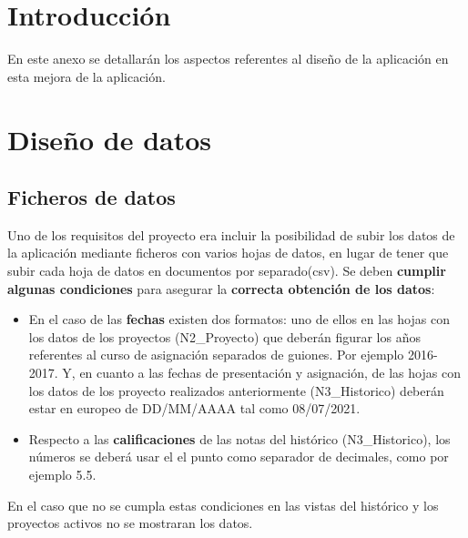 
\section{Introducción}
En este anexo se detallarán los aspectos referentes al diseño de la aplicación en esta mejora de la aplicación.

\section{Diseño de datos}

\subsection{Ficheros de datos}

Uno de los requisitos del proyecto era incluir la posibilidad de subir los datos de la aplicación mediante ficheros con varios hojas de datos, en lugar de tener que subir cada hoja de datos en documentos por separado(csv). Se deben \textbf{cumplir algunas condiciones} para asegurar la \textbf{correcta obtención de los datos}:
\begin{itemize}
	\tightlist
	\item En el caso de las \textbf{fechas} existen dos formatos: uno de ellos en las hojas con los datos de los proyectos (N2\_Proyecto) que deberán figurar los años referentes al curso de asignación separados de guiones. Por ejemplo 2016-2017. 
	Y, en cuanto a las fechas de presentación y asignación, de las hojas con los datos de los proyecto realizados anteriormente (N3\_Historico) deberán estar en europeo de DD/MM/AAAA tal como 08/07/2021.
	
	\item Respecto a las \textbf{calificaciones} de las notas del histórico (N3\_Historico), los números se deberá usar el el punto como separador de decimales, como por ejemplo 5.5.
\end{itemize}

En el caso que no se cumpla estas condiciones en las vistas del histórico y los proyectos activos no se mostraran los datos.

